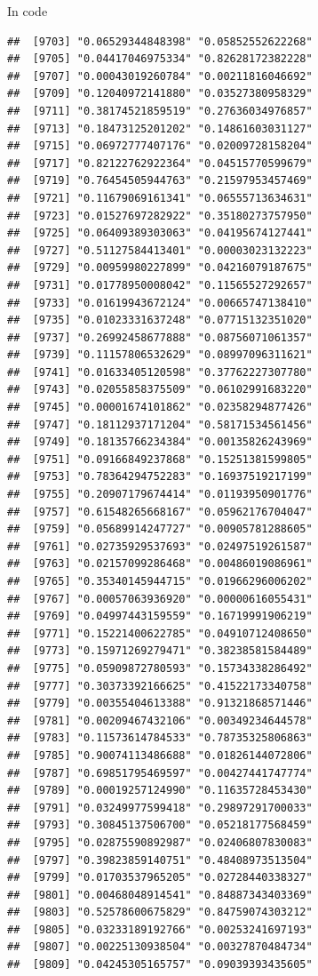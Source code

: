 \documentclass[ignorenonframetext,]{beamer}
\begin{document}
\begin{frame}[fragile]{In code}
\begin{verbatim}
##  [9703] "0.06529344848398" "0.05852552622268"
##  [9705] "0.04417046975334" "0.82628172382228"
##  [9707] "0.00043019260784" "0.00211816046692"
##  [9709] "0.12040972141880" "0.03527380958329"
##  [9711] "0.38174521859519" "0.27636034976857"
##  [9713] "0.18473125201202" "0.14861603031127"
##  [9715] "0.06972777407176" "0.02009728158204"
##  [9717] "0.82122762922364" "0.04515770599679"
##  [9719] "0.76454505944763" "0.21597953457469"
##  [9721] "0.11679069161341" "0.06555713634631"
##  [9723] "0.01527697282922" "0.35180273757950"
##  [9725] "0.06409389303063" "0.04195674127441"
##  [9727] "0.51127584413401" "0.00003023132223"
##  [9729] "0.00959980227899" "0.04216079187675"
##  [9731] "0.01778950008042" "0.11565527292657"
##  [9733] "0.01619943672124" "0.00665747138410"
##  [9735] "0.01023331637248" "0.07715132351020"
##  [9737] "0.26992458677888" "0.08756071061357"
##  [9739] "0.11157806532629" "0.08997096311621"
##  [9741] "0.01633405120598" "0.37762227307780"
##  [9743] "0.02055858375509" "0.06102991683220"
##  [9745] "0.00001674101862" "0.02358294877426"
##  [9747] "0.18112937171204" "0.58171534561456"
##  [9749] "0.18135766234384" "0.00135826243969"
##  [9751] "0.09166849237868" "0.15251381599805"
##  [9753] "0.78364294752283" "0.16937519217199"
##  [9755] "0.20907179674414" "0.01193950901776"
##  [9757] "0.61548265668167" "0.05962176704047"
##  [9759] "0.05689914247727" "0.00905781288605"
##  [9761] "0.02735929537693" "0.02497519261587"
##  [9763] "0.02157099286468" "0.00486019086961"
##  [9765] "0.35340145944715" "0.01966296006202"
##  [9767] "0.00057063936920" "0.00000616055431"
##  [9769] "0.04997443159559" "0.16719991906219"
##  [9771] "0.15221400622785" "0.04910712408650"
##  [9773] "0.15971269279471" "0.38238581584489"
##  [9775] "0.05909872780593" "0.15734338286492"
##  [9777] "0.30373392166625" "0.41522173340758"
##  [9779] "0.00355404613388" "0.91321868571446"
##  [9781] "0.00209467432106" "0.00349234644578"
##  [9783] "0.11573614784533" "0.78735325806863"
##  [9785] "0.90074113486688" "0.01826144072806"
##  [9787] "0.69851795469597" "0.00427441747774"
##  [9789] "0.00019257124990" "0.11635728453430"
##  [9791] "0.03249977599418" "0.29897291700033"
##  [9793] "0.30845137506700" "0.05218177568459"
##  [9795] "0.02875590892987" "0.02406807830083"
##  [9797] "0.39823859140751" "0.48408973513504"
##  [9799] "0.01703537965205" "0.02728440338327"
##  [9801] "0.00468048914541" "0.84887343403369"
##  [9803] "0.52578600675829" "0.84759074303212"
##  [9805] "0.03233189192766" "0.00253241697193"
##  [9807] "0.00225130938504" "0.00327870484734"
##  [9809] "0.04245305165757" "0.09039393435605"

\end{verbatim}
\end{frame}
\end{document}
